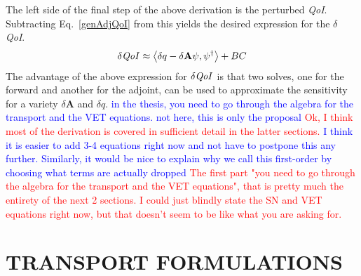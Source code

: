 \documentclass[12pt]{report}
\newcommand{\bra}{\left\langle}
\newcommand{\ket}{\right\rangle}
\newcommand{\qoi}{{\it QoI}\xspace}
\newcommand{\comment}[2]{\marginpar{\textcolor{#2}{$\star$}}\textcolor{#2}{#1}\newline}
\newcommand{\iwh}[1]{\comment{#1}{red}}
\newcommand{\jcr}[1]{\comment{#1}{blue}}
\newcommand{\iwh}[1]{\phantom{a}}
\newcommand{\jcr}[1]{\phantom{a}}
\begin{document}
The left side of the final step of the above derivation is the perturbed \qoi. Subtracting Eq.~\eqref{genAdjQoI} from this yields the desired expression for the $\delta$ \qoi.
\begin{equation}
\label{genAdjSens}
\delta \qoi \approx \bra \delta q - \delta \mathbf{A} \psi , \psi^\dag \ket + BC
\end{equation}
The advantage of the above expression for $\delta \qoi$ is that two solves, one for the forward and another for the adjoint, can be used to approximate the sensitivity for a variety $\delta \mathbf{A}$ and $\delta q$.
\jcr{in the thesis, you need to go through the algebra for the transport and the VET equations. not here, this is only the proposal}
\iwh{Ok, I think most of the derivation is covered in sufficient detail in the latter sections.}
\jcr{I think it is easier to add 3-4 equations right now and not have to postpone this any further. Similarly, it would be nice to explain why we call this first-order by choosing what terms are actually dropped}
\iwh{The first part "you need to go through the algebra for the transport and the VET equations", that is pretty much the entirety of the next 2 
sections. I could just blindly state the SN and VET equations right now, but that doesn't seem to be like what you are asking for.}

%
%
%
%



\chapter{\uppercase {Transport Formulations}}
\end{document}
